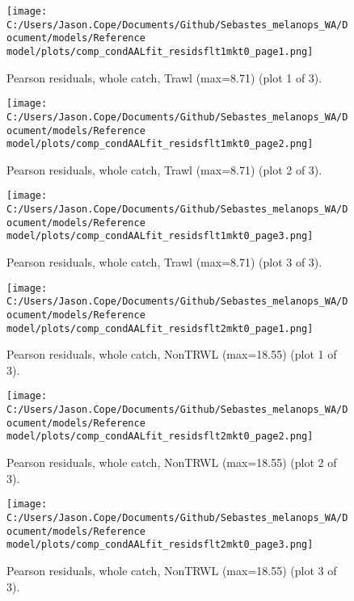 \documentclass[11pt,
  letterpaper,
]{article}
\begin{document}
\begin{figure}
{\centering
\texttt{[image: C:/Users/Jason.Cope/Documents/Github/Sebastes\_melanops\_WA/Document/models/Reference model/plots/comp\_condAALfit\_residsflt1mkt0\_page1.png]}
}
\caption{Pearson residuals, whole catch, Trawl (max=8.71) (plot 1 of 3).\label{fig:comp_condAALfit_residsflt1mkt0_page1}}
\end{figure}

\begin{figure}
{\centering
\texttt{[image: C:/Users/Jason.Cope/Documents/Github/Sebastes\_melanops\_WA/Document/models/Reference model/plots/comp\_condAALfit\_residsflt1mkt0\_page2.png]}
}
\caption{Pearson residuals, whole catch, Trawl (max=8.71) (plot 2 of 3).\label{fig:comp_condAALfit_residsflt1mkt0_page2}}
\end{figure}

\begin{figure}
{\centering
\texttt{[image: C:/Users/Jason.Cope/Documents/Github/Sebastes\_melanops\_WA/Document/models/Reference model/plots/comp\_condAALfit\_residsflt1mkt0\_page3.png]}
}
\caption{Pearson residuals, whole catch, Trawl (max=8.71) (plot 3 of 3).\label{fig:comp_condAALfit_residsflt1mkt0_page3}}
\end{figure}

\begin{figure}
{\centering
\texttt{[image: C:/Users/Jason.Cope/Documents/Github/Sebastes\_melanops\_WA/Document/models/Reference model/plots/comp\_condAALfit\_residsflt2mkt0\_page1.png]}
}
\caption{Pearson residuals, whole catch, NonTRWL (max=18.55) (plot 1 of 3).\label{fig:comp_condAALfit_residsflt2mkt0_page1}}
\end{figure}

\begin{figure}
{\centering
\texttt{[image: C:/Users/Jason.Cope/Documents/Github/Sebastes\_melanops\_WA/Document/models/Reference model/plots/comp\_condAALfit\_residsflt2mkt0\_page2.png]}
}
\caption{Pearson residuals, whole catch, NonTRWL (max=18.55) (plot 2 of 3).\label{fig:comp_condAALfit_residsflt2mkt0_page2}}
\end{figure}

\begin{figure}
{\centering
\texttt{[image: C:/Users/Jason.Cope/Documents/Github/Sebastes\_melanops\_WA/Document/models/Reference model/plots/comp\_condAALfit\_residsflt2mkt0\_page3.png]}
}
\caption{Pearson residuals, whole catch, NonTRWL (max=18.55) (plot 3 of 3).\label{fig:comp_condAALfit_residsflt2mkt0_page3}}
\end{figure}
\end{document}
